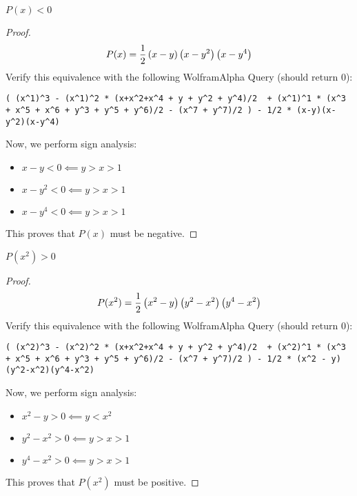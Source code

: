 \documentclass[10pt]{../usamts}
\begin{document}
\begin{solution}
\begin{claim}
    $P(x) < 0$
    \label{claim:px}
\end{claim}
\begin{proof}
    $$P(x) = \frac{1}{2}\left( x-y \right)\left( x-y^2 \right)\left( x-y^4 \right)$$
    Verify this equivalence with the following WolframAlpha Query (should return $0$): 
\begin{lstlisting}
( (x^1)^3 - (x^1)^2 * (x+x^2+x^4 + y + y^2 + y^4)/2  + (x^1)^1 * (x^3 + x^5 + x^6 + y^3 + y^5 + y^6)/2 - (x^7 + y^7)/2 ) - 1/2 * (x-y)(x-y^2)(x-y^4)
\end{lstlisting}
    Now, we perform sign analysis:
    \begin{itemize}
        \item $x - y < 0 \impliedby y > x > 1$
        \item $x - y^2 < 0 \impliedby y > x > 1$
        \item $x - y^4 < 0 \impliedby y > x > 1$
    \end{itemize}
    This proves that $P(x)$ must be negative.
\end{proof}

\begin{claim}
    $P(x^2) > 0$
    \label{claim:px2}
\end{claim}
\begin{proof}
    $$P(x^2) = \frac{1}{2} \left( x^2-y \right)\left( y^2 - x^2 \right)\left( y^4 - x^2 \right)$$
    Verify this equivalence with the following WolframAlpha Query (should return $0$): 
\begin{lstlisting}
( (x^2)^3 - (x^2)^2 * (x+x^2+x^4 + y + y^2 + y^4)/2  + (x^2)^1 * (x^3 + x^5 + x^6 + y^3 + y^5 + y^6)/2 - (x^7 + y^7)/2 ) - 1/2 * (x^2 - y)(y^2-x^2)(y^4-x^2)
\end{lstlisting}
    Now, we perform sign analysis:
    \begin{itemize}
        \item $x^2 - y > 0 \impliedby y < x^2$
        \item $y^2 - x^2 > 0 \impliedby y > x > 1$
        \item $y^4 - x^2 > 0 \impliedby y > x > 1$
    \end{itemize}
    This proves that $P(x^2)$ must be positive.
\end{proof}


\end{solution}
\end{document}
